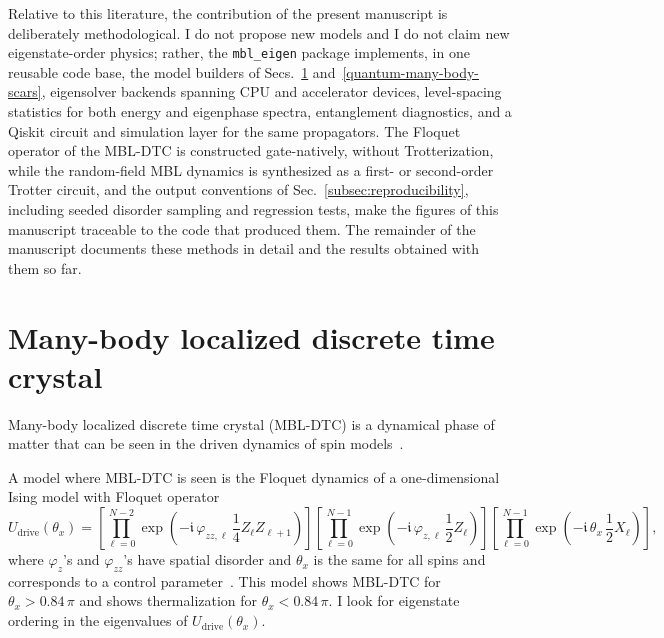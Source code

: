 \documentclass[longbibliography]{revtex4-2}
\newcommand{\im}[0]{\mathfrak{i}}
\begin{document}
Relative to this literature, the contribution of the present manuscript
is deliberately methodological. I do not propose new models and I do
not claim new eigenstate-order physics; rather, the
\texttt{mbl\_eigen} package implements, in one reusable code base, the
model builders of
Secs.~\ref{many-body-localized-discrete-time-crystal}
and~\ref{quantum-many-body-scars}, eigensolver backends spanning CPU
and accelerator devices, level-spacing statistics for both energy and
eigenphase spectra, entanglement diagnostics, and a Qiskit circuit and
simulation layer for the same propagators. The Floquet operator of the
MBL-DTC is constructed gate-natively, without Trotterization, while
the random-field MBL dynamics is synthesized as a first- or
second-order Trotter circuit, and the output conventions of
Sec.~\ref{subsec:reproducibility}, including seeded disorder sampling
and regression tests, make the figures of this manuscript traceable to
the code that produced them. The remainder of the manuscript documents
these methods in detail and the results obtained with them so far.

\section{Many-body localized discrete time crystal}\label{many-body-localized-discrete-time-crystal}

Many-body localized discrete time crystal (MBL-DTC) is a dynamical
phase of matter that can be seen in the driven dynamics of spin
models~\cite{ippoliti2021many, mi2022time, choi2017observation,
rovny2018observation, zhang2017observationdiscrete, randall2021many}.

A model where MBL-DTC is seen is the Floquet dynamics of a
one-dimensional Ising model with Floquet operator
\begin{equation}\label{eq:mbldtc-notes}
    U_{\mathrm{drive}}(\theta_x) =
    \left[\prod_{\ell=0}^{N-2}
    \exp\left(-\im\, \varphi_{zz,\ell}\,
    \frac{1}{4} Z_{\ell} Z_{\ell+1}\right)\right]
    \left[\prod_{\ell=0}^{N-1}
    \exp\left(-\im\, \varphi_{z,\ell}\,
    \frac{1}{2} Z_{\ell}\right)\right]
    \left[\prod_{\ell=0}^{N-1}
    \exp\left(-\im\, \theta_{x}\,
    \frac{1}{2} X_{\ell}\right)\right],
\end{equation}
where $\varphi_{z}$'s and $\varphi_{zz}$'s have spatial disorder and
$\theta_{x}$ is the same for all spins and corresponds to a control
parameter~\cite{ippoliti2021many, mi2022time}. This model shows
MBL-DTC for $\theta_x > 0.84\,\pi$ and shows thermalization for
$\theta_x < 0.84\,\pi$. I look for eigenstate ordering in the eigenvalues
of $U_{\mathrm{drive}}(\theta_x)$.
\end{document}
